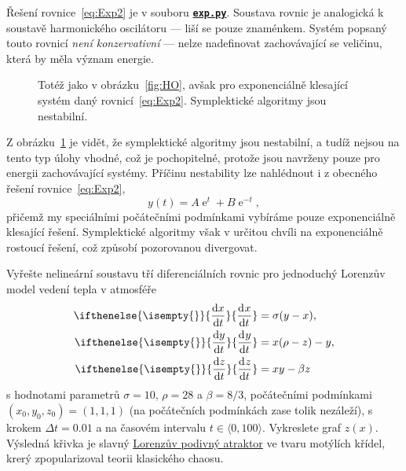 \documentclass[a4paper,11pt,twoside]{article}
\DeclareMathOperator{\e}{e}             %
\renewcommand{\d}{\mathrm{d}}           %
\newcommand{\derivative}[3][]{\ifthenelse{\isempty{#1}}	    %
	{\frac{\d{#2}}{\d{#3}}}
	{\frac{\d^{#1}{#2}}{\d{#3}^{#1}}}
}
\def\ghfile#1#2{\textnormal{\textbf{\texttt{\href{https://github.com/PavelStransky/PCInPhysics/blob/main/#1#2}{#2}}}}}
\theoremstyle{red}
\theoremstyle{green}
\begin{document}
\begin{solution}
    Řešení rovnice~\eqref{eq:Exp2} je v souboru \ghfile{python/ode/}{exp.py}.
    Soustava rovnic je analogická k soustavě harmonického oscilátoru --- liší se pouze znaménkem.
    Systém popsaný touto rovnicí \emph{není konzervativní} --- nelze nadefinovat zachovávající se veličinu, která by měla význam energie.

    \begin{figure}[!htbp]
        \centering
        \caption{
            \protect\small
            Totéž jako v obrázku~\ref{fig:HO}, avšak pro exponenciálně klesající systém daný rovnicí~\eqref{eq:Exp2}.
            Symplektické algoritmy jsou nestabilní.
            }	
        \label{fig:Exp2}
    \end{figure}
    
    Z obrázku~\ref{fig:Exp2} je vidět, že symplektické algoritmy jsou nestabilní, a tudíž nejsou na tento typ úlohy vhodné, což je pochopitelné, protože jsou navrženy pouze pro energii zachovávající systémy.
    Příčinu nestability lze nahlédnout i z obecného řešení rovnice~\eqref{eq:Exp2},
    \begin{equation}
        y(t)=A\e^{t}+B\e^{-t},
    \end{equation}
    přičemž my speciálními počátečními podmínkami vybíráme pouze exponenciálně klesající řešení.
    Symplektické algoritmy však v určitou chvíli  na exponenciálně rostoucí řešení, což způsobí pozorovanou divergovat.
\end{solution}

\begin{solved}
    Vyřešte nelineární soustavu tří diferenciálních rovnic pro jednoduchý Lorenzův model vedení tepla v atmosféře
    \begin{align}
        \derivative{x}{t}&=\sigma(y-x),\nonumber\\
        \label{eq:Lorenz}
        \derivative{y}{t}&=x(\rho-z)-y,\\
        \derivative{z}{t}&=xy-\beta z\nonumber
    \end{align}
    s hodnotami parametrů $\sigma=10$, $\rho=28$ a $\beta=8/3$, počátečními podmínkami $(x_0, y_0, z_0)=(1,1,1)$ (na počátečních podmínkách zase tolik nezáleží), s krokem $\Delta t=0.01$ a na časovém intervalu $t\in\langle0,100\rangle$.
    Vykreslete graf $z(x)$.
    Výsledná křivka je slavný \href{https://cs.wikipedia.org/wiki/Lorenz%C5%AFv_atraktor}{Lorenzův podivný atraktor} ve tvaru motýlích křídel, krerý zpopularizoval teorii klasického chaosu.
\end{solved}
\end{document}
